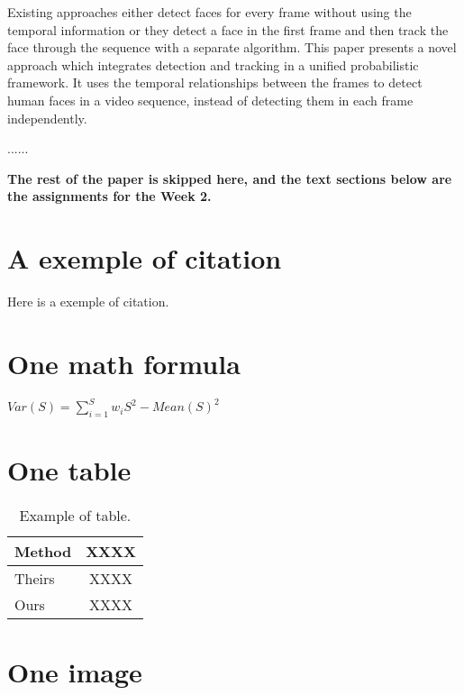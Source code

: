 \documentclass[10pt,twocolumn,letterpaper]{article}
\begin{document}
Existing approaches either detect faces for every frame
without using the temporal information or they detect a face
in the first frame and then track the face through the sequence with a separate algorithm. This paper presents a
novel approach which integrates detection and tracking in
a unified probabilistic framework. It uses the temporal relationships between the frames to detect human faces in a
video sequence, instead of detecting them in each frame independently.

......

{\bf The rest of the paper is skipped here, and the text sections below are the assignments for the Week 2.}

\section{A exemple of citation}

Here is a exemple of citation\cite{Mikolajczyk2001Face}.


\section{One math formula}

$Var(S) = \sum_{i=1}^S w_i{S}^2-{Mean(S)}^2$

\section{One table}

\begin{table}[H]
\begin{center}
\begin{tabular}{|l|c|}
\hline
Method & XXXX \\
\hline
Theirs & XXXX \\
Ours & XXXX\\
\hline
\end{tabular}
\end{center}
\caption{Example of table.}
\end{table}



\section{One image}
\end{document}

